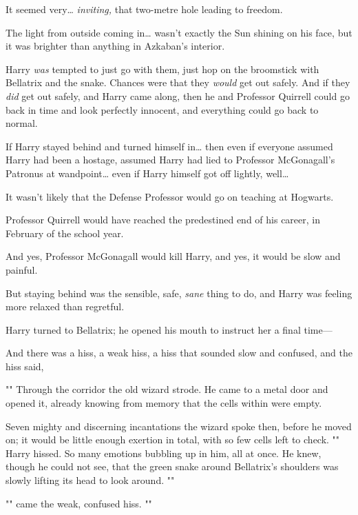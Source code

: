 It seemed very{\ldots} \emph{inviting,} that two-metre hole leading to freedom.

The light from outside coming in{\ldots} wasn't exactly the Sun shining on his
face, but it was brighter than anything in Azkaban's interior.

Harry \emph{was} tempted to just go with them, just hop on the broomstick with
Bellatrix and the snake. Chances were that they \emph{would} get out safely.
And if they \emph{did} get out safely, and Harry came along, then he and
Professor Quirrell could go back in time and look perfectly innocent, and
everything could go back to normal.

If Harry stayed behind and turned himself in{\ldots} then even if everyone
assumed Harry had been a hostage, assumed Harry had lied to Professor
McGonagall's Patronus at wandpoint{\ldots} even if Harry himself got off
lightly, well{\ldots}

It wasn't likely that the Defense Professor would go on teaching at Hogwarts.

Professor Quirrell would have reached the predestined end of his career, in
February of the school year.

And yes, Professor McGonagall would kill Harry, and yes, it would be slow and
painful.

But staying behind was the sensible, safe, \emph{sane} thing to do, and Harry
was feeling more relaxed than regretful.

Harry turned to Bellatrix; he opened his mouth to instruct her a final time---

And there was a hiss, a weak hiss, a hiss that sounded slow and confused, and
the hiss said,

""
\later
Through the corridor the old wizard strode. He came to a metal door and opened
it, already knowing from memory that the cells within were empty.

Seven mighty and discerning incantations the wizard spoke then, before he moved
on; it would be little enough exertion in total, with so few cells left to
check.
\later
"" Harry hissed. So many emotions bubbling up in him, all at
once. He knew, though he could not see, that the green snake around Bellatrix's
shoulders was slowly lifting its head to look around. ""

"" came the weak, confused hiss. ""

